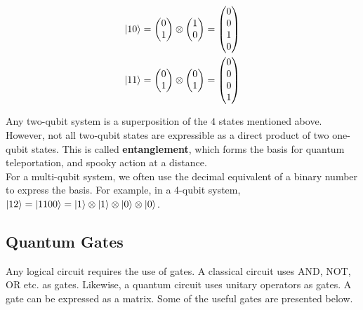\begin{equation*}
\begin{split}
\left\vert 10\right\rangle&=
\begin{pmatrix}
0\\
1
\end{pmatrix}
\otimes
\begin{pmatrix}
1\\
0
\end{pmatrix}=
\begin{pmatrix}
0\\
0\\
1\\
0
\end{pmatrix}
\\
\left\vert 11\right\rangle&=
\begin{pmatrix}
0\\
1
\end{pmatrix}
\otimes
\begin{pmatrix}
0\\
1
\end{pmatrix}=
\begin{pmatrix}
0\\
0\\
0\\
1
\end{pmatrix}
\end{split}
\end{equation*}

Any two-qubit system is a superposition of the $4$ states mentioned above. However, not all two-qubit states are expressible as a direct product of two one-qubit states. This is called \textbf{entanglement}, which forms the basis for quantum teleportation, and spooky action at a distance.\\
For a multi-qubit system, we often use the decimal equivalent of a binary number to express the basis. For example, in a 4-qubit system, $\left\vert 12\right\rangle=\left\vert 1100\right\rangle=\left\vert 1\right\rangle\otimes\left\vert 1\right\rangle\otimes\left\vert 0\right\rangle\otimes\left\vert 0\right\rangle$.

\subsection{Quantum Gates}
Any logical circuit requires the use of gates. A classical circuit uses AND, NOT, OR etc. as gates. Likewise, a quantum circuit uses unitary operators as gates. A gate can be expressed as a matrix. Some of the useful gates are presented below.

